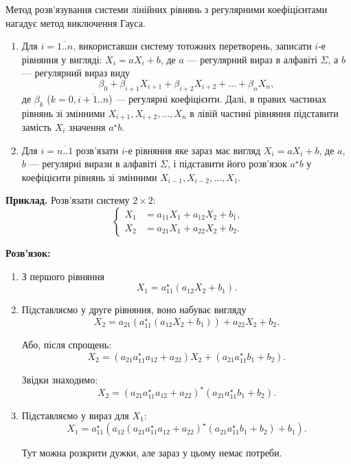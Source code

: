 Метод розв'язування системи лінійних рівнянь з регулярними коефіцієнтами нагадує метод виключення Гауса.
\begin{enumerate}
	\item Для $i = \overline{1..n}$, використавши систему тотожних перетворень, записати  $i$-е рівняння у вигляді: $X_i = a X_i + b$, де $a$ --- регулярний вираз в алфавіті $\Sigma$, а $b$ --- регулярний вираз виду \[\beta_0 + \beta_{i+1} X_{i+1} + \beta_{i+2} X_{i+2} + \ldots + \beta_n X_n,\]	де $\beta_k$ ($k = 0, \overline{i+1..n}$) --- регулярні коефіцієнти. Далі, в правих частинах рівнянь зі змінними $X_{i+1}, X_{i+2}, \ldots, X_n$ в лівій частині рівняння підставити замість $X_i$ значення $a^\star b$.

	\item Для $i = \overline{n..1}$ розв'язати $i$-е рівняння яке зараз має вигляд $X_i = a X_i + b$, де $a$, $b$ --- регулярні вирази в алфавіті $\Sigma$, і підставити його розв'язок $a^\star b$	у коефіцієнти рівнянь зі змінними $X_{i-1}, X_{i-2}, \ldots, X_1$.
\end{enumerate}

\textbf{Приклад.} Розв'язати систему $2\times2$:
\begin{equation}
	\left\{
		\begin{aligned}
			X_1 &= a_{11} X_1 + a_{12} X_2 + b_1, \\
			X_2 &= a_{21} X_1 + a_{22} X_2 + b_2.
		\end{aligned}
	\right.
\end{equation}

\textbf{Розв'язок:}
\begin{enumerate}
	\item З першого рівняння
	\begin{equation}
		X_1 = a_{11}^\star (a_{12} X_2 + b_1).
	\end{equation}

	\item Підставляємо у друге рівняння, воно набуває вигляду
	\begin{equation}
		X_2 = a_{21} (a_{11}^\star (a_{12} X_2 + b_1)) + a_{22} X_2 + b_2.
	\end{equation}

	Або, після спрощень:
	\begin{equation}
		X_2 = (a_{21} a_{11}^\star a_{12} + a_{22}) X_2 + (a_{21} a_{11}^\star b_1 + b_2).
	\end{equation}

	Звідки знаходимо:
	\begin{equation}
		X_2 = (a_{21} a_{11}^\star a_{12} + a_{22})^\star (a_{21} a_{11}^\star b_1 + b_2).
	\end{equation}

	\item Підставляємо у вираз для $X_1$:
	\begin{equation}
		X_1 = a_{11}^\star (a_{12} (a_{21} a_{11}^\star a_{12} + a_{22})^\star (a_{21} a_{11}^\star b_1 + b_2) + b_1).
	\end{equation}

	Тут можна розкрити дужки, але зараз у цьому немає потреби.
\end{enumerate}

